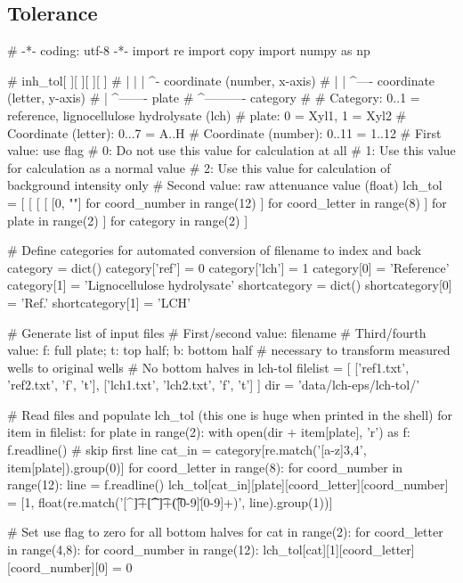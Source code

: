 \subsection{\LCH{} Tolerance}
\begin{pycode}
# -*- coding: utf-8 -*-
import re
import copy
import numpy as np

# inh_tol[ ][ ][ ][ ]
#         |  |  |  ^- coordinate (number, x-axis)
#         |  |  ^---- coordinate (letter, y-axis)
#         |  ^------- plate
#         ^---------- category
#
# Category: 0..1 = reference, lignocellulose hydrolysate (lch)
# plate: 0 = Xyl1, 1 = Xyl2
# Coordinate (letter): 0...7 = A..H
# Coordinate (number): 0..11 = 1..12
# First value: use flag
#    0: Do not use this value for calculation at all
#    1: Use this value for calculation as a normal value
#    2: Use this value for calculation of background intensity only
# Second value: raw attenuance value (float)
lch_tol = [
    [
        [
            [
                [0, ""] for coord_number in range(12)
            ]
             for coord_letter in range(8)
        ]
        for plate in range(2)
    ]
    for category in range(2)
]

# Define categories for automated conversion of filename to index and back
category = dict()
category['ref'] = 0
category['lch'] = 1
category[0] = 'Reference'
category[1] = 'Lignocellulose hydrolysate'
shortcategory = dict()
shortcategory[0] = 'Ref.'
shortcategory[1] = 'LCH'

# Generate list of input files
# First/second value: filename
# Third/fourth value: f: full plate; t: top half; b: bottom half
#     necessary to transform measured wells to original wells
# No bottom halves in lch-tol
filelist = [
    ['ref1.txt', 'ref2.txt', 'f', 't'],
    ['lch1.txt', 'lch2.txt', 'f', 't']
]
dir = 'data/lch-eps/lch-tol/'

# Read files and populate lch_tol (this one is huge when printed in the shell)
for item in filelist:
    for plate in range(2):
        with open(dir + item[plate], 'r') as f:
            f.readline() # skip first line
            cat_in = category[re.match('[a-z]{3,4}', item[plate]).group(0)]
            for coord_letter in range(8):
                for coord_number in range(12):
                    line = f.readline()
                    lch_tol[cat_in][plate][coord_letter][coord_number] = [1, float(re.match('[^\t]+\t[^\t]+\t([0-9]\.[0-9]+)', line).group(1))]

# Set use flag to zero for all bottom halves
for cat in range(2):
    for coord_letter in range(4,8):
        for coord_number in range(12):
            lch_tol[cat][1][coord_letter][coord_number][0] = 0


\end{pycode}
